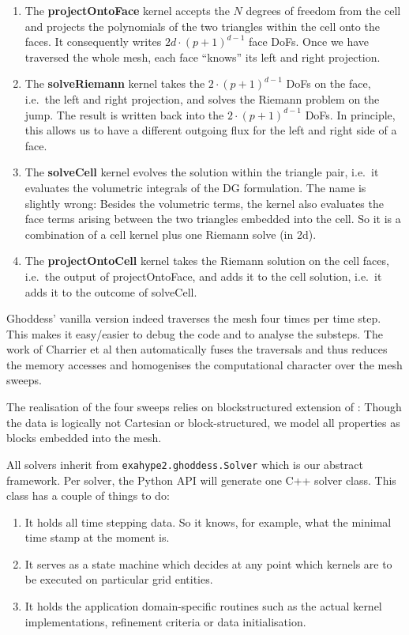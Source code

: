 \begin{enumerate}
  \item The {\bf projectOntoFace} kernel accepts the $N$ degrees of freedom from
  the cell and projects the polynomials of the two triangles within the cell
  onto the faces. It consequently writes $2d \cdot (p+1)^{d-1}$ face DoFs. Once
  we have traversed the whole mesh, each face ``knows'' its left and right
  projection.
  \item The {\bf solveRiemann} kernel takes the $2 \cdot (p+1)^{d-1}$ DoFs on
  the face, i.e.~the left and right projection, and solves the Riemann problem
  on the jump. The result is written back into the $2 \cdot (p+1)^{d-1}$ DoFs.
  In principle, this allows us to have a different outgoing flux for the left
  and right side of a face.
  \item The {\bf solveCell} kernel evolves the solution within the triangle
  pair, i.e.~it evaluates the volumetric integrals of the DG formulation. The
  name is slightly wrong: Besides the volumetric terms, the kernel also
  evaluates the face terms arising between the two triangles embedded into the
  cell. So it is a combination of a cell kernel plus one Riemann solve (in 2d).
  \item The {\bf projectOntoCell} kernel takes the Riemann solution on the cell
  faces, i.e.~the output of projectOntoFace, and adds it to the cell solution,
  i.e.~it adds it to the outcome of solveCell.
\end{enumerate}


\noindent
Ghoddess' vanilla version indeed traverses the mesh four times per time step.
This makes it easy/easier to debug the code and to analyse the substeps.
The work of Charrier et al then automatically fuses the traversals and thus
reduces the memory accesses and homogenises the computational character over the
mesh sweeps.


The realisation of the four sweeps relies on blockstructured extension of
\Peano:
Though the data is logically not Cartesian or block-structured, we model all
properties as blocks embedded into the mesh.


All solvers inherit from \texttt{exahype2.ghoddess.Solver} which is our abstract
framework.
Per solver, the Python API will generate one C++ solver class.
This class has a couple of things to do:

\begin{enumerate}
  \item It holds all time stepping data. So it knows, for example, what the
  minimal time stamp at the moment is.
  \item It serves as a state machine which decides at any point which kernels
  are to be executed on particular grid entities.
  \item It holds the application domain-specific routines such as the actual
  kernel implementations, refinement criteria or data initialisation.
\end{enumerate}



